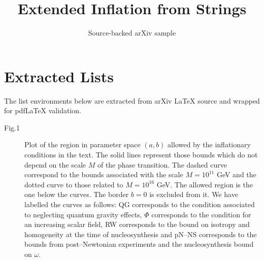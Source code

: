 \documentclass[11pt]{article}
\title{Extended Inflation from Strings}
\author{Source-backed arXiv sample}
\date{}
\begin{document}
\maketitle
\section{Extracted Lists}

The list environments below are extracted from arXiv LaTeX source and wrapped for pdfLaTeX validation.

\begin{description}

\item[Fig.1]
Plot of the region in parameter space $(a, b)$ allowed by the
inflationary conditions in the text. The solid lines represent
those bounds
which do not depend on the scale $M$ of the phase transition.
The dashed curve correspond to the bounds associated with the
scale $M=10^{11}$ GeV and the dotted curve to those related to
$M=10^{16}$ GeV. The allowed region is the one below the curves.
The border $b=0$ is excluded from it.
We have labelled the curves as follows: QG corresponds to the
condition associated to neglecting quantum gravity effects,
$\Phi$ corresponds to the condition for an increasing scalar
field, RW corresponds to the bound on isotropy and
homogeneity at the time of nucleosynthesis and pN--NS
corresponds to the bounds from post--Newtonian experiments and
the nucleosynthesis bound on $\omega$.

\end{description}
\end{document}
